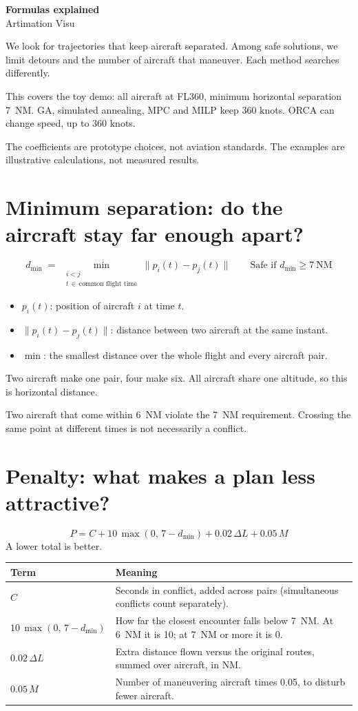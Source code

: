 \documentclass[10pt,a4paper]{article}
\newcommand{\dmin}{d_{\min}}
\begin{document}
{\bfseries\LARGE Formulas explained}\\[2pt]
Artimation Visu

We look for trajectories that keep aircraft separated. Among safe solutions, we limit detours and the number of aircraft that maneuver. Each method searches differently.

This covers the toy demo: all aircraft at FL360, minimum horizontal separation 7~NM. GA, simulated annealing, MPC and MILP keep 360 knots. ORCA can change speed, up to 360 knots.

The coefficients are prototype choices, not aviation standards. The examples are illustrative calculations, not measured results.

\section{Minimum separation: do the aircraft stay far enough apart?}
\[
\dmin \;=\; \min_{\substack{i<j\\ t\,\in\,\text{common flight time}}} \lVert p_i(t)-p_j(t)\rVert
\qquad \text{Safe if } \dmin \ge 7\ \text{NM}
\]
\begin{itemize}
\item $p_i(t)$: position of aircraft $i$ at time $t$.
\item $\lVert p_i(t)-p_j(t)\rVert$: distance between two aircraft at the same instant.
\item $\min$: the smallest distance over the whole flight and every aircraft pair.
\end{itemize}
Two aircraft make one pair, four make six. All aircraft share one altitude, so this is horizontal distance.

Two aircraft that come within 6~NM violate the 7~NM requirement. Crossing the same point at different times is not necessarily a conflict.

\section{Penalty: what makes a plan less attractive?}
\[
P = C + 10\,\max(0,\,7-\dmin) + 0.02\,\Delta L + 0.05\,M
\]
A lower total is better.

\begin{tabularx}{\linewidth}{@{}lX@{}}
\toprule
Term & Meaning\\
\midrule
$C$ & Seconds in conflict, added across pairs (simultaneous conflicts count separately).\\
$10\,\max(0,\,7-\dmin)$ & How far the closest encounter falls below 7~NM. At 6~NM it is 10; at 7~NM or more it is 0.\\
$0.02\,\Delta L$ & Extra distance flown versus the original routes, summed over aircraft, in NM.\\
$0.05\,M$ & Number of maneuvering aircraft times 0.05, to disturb fewer aircraft.\\
\bottomrule
\end{tabularx}
\end{document}
